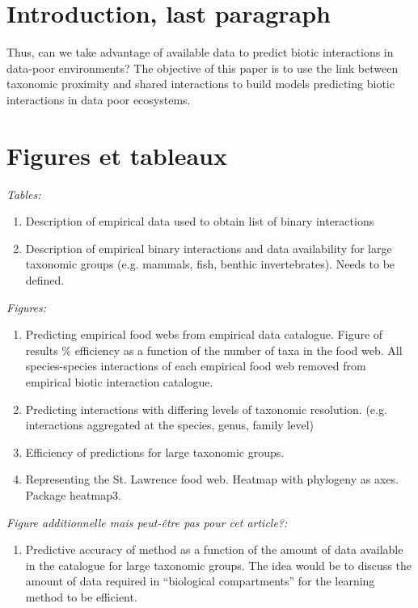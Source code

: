 \documentclass[letterpaper]{article}
\begin{document}
\section{Introduction, last paragraph}

Thus, can we take advantage of available data to predict biotic interactions in data-poor environments? The objective of this paper is to use the link between taxonomic proximity and shared interactions to build models predicting biotic interactions in data poor ecosystems.

\section{Figures et tableaux}

\textit{Tables:}
\begin{enumerate}
  \item Description of empirical data used to obtain list of binary interactions
  \item Description of empirical binary interactions and data availability for large taxonomic groups (e.g. mammals, fish, benthic invertebrates). Needs to be defined.
\end{enumerate}

\textit{Figures:}
\begin{enumerate}
  \item Predicting empirical food webs from empirical data catalogue. Figure of results \% efficiency as a function of the number of taxa in the food web. All species-species interactions of each empirical food web removed from empirical biotic interaction catalogue.
  \item Predicting interactions with differing levels of taxonomic resolution. (e.g. interactions aggregated at the species, genus, family level)
  \item Efficiency of predictions for large taxonomic groups.
  \item Representing the St. Lawrence food web. Heatmap with phylogeny as axes. Package heatmap3.
\end{enumerate}

\textit{Figure additionnelle mais peut-être pas pour cet article?:}
\begin{enumerate}
  \item Predictive accuracy of method as a function of the amount of data available in the catalogue for large taxonomic groups. The idea would be to discuss the amount of data required in ``biological compartments'' for the learning method to be efficient.
\end{enumerate}
\end{document}
